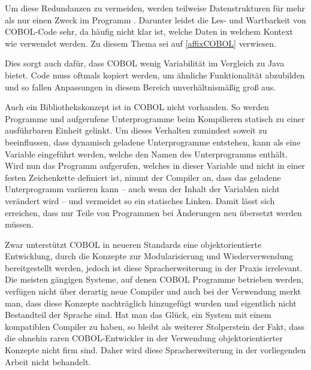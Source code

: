 Um diese Redundanzen zu vermeiden, werden teilweise Datenstrukturen für mehr als nur einen Zweck im Programm . Darunter leidet die Les- und Wartbarkeit von COBOL-Code sehr, da häufig nicht klar ist, welche Daten in welchem Kontext wie verwendet werden. Zu diesem Thema sei auf \autoref{affixCOBOL} verwiesen.

Dies sorgt auch dafür, dass COBOL wenig Variabilität im Vergleich zu Java bietet. Code muss oftmals kopiert werden, um ähnliche Funktionalität abzubilden und so fallen Anpassungen in diesem Bereich unverhältnismäßig groß aus.

Auch ein Bibliothekskonzept ist in COBOL nicht vorhanden. So werden Programme und aufgerufene Unterprogramme beim Kompilieren statisch zu einer ausführbaren Einheit gelinkt. Um dieses Verhalten zumindest soweit zu beeinflussen, dass dynamisch geladene Unterprogramme entstehen, kann als  eine Variable eingeführt werden, welche den Namen des Unterprogramms enthält. Wird nun das Programm aufgerufen, welches in dieser Variable und nicht in einer festen Zeichenkette definiert ist, nimmt der Compiler an, dass das geladene Unterprogramm variieren kann -- auch wenn der Inhalt der Variablen nicht verändert wird -- und vermeidet so ein statisches Linken. Damit lässt sich erreichen, dass nur Teile von Programmen bei Änderungen neu übersetzt werden müssen.

Zwar unterstützt COBOL in neueren Standards eine objektorientierte Entwicklung, durch die Konzepte zur Modularisierung und Wiederverwendung bereitgestellt werden, jedoch ist diese Spracherweiterung in der Praxis irrelevant. Die meisten gängigen Systeme, auf denen COBOL Programme betrieben werden, verfügen nicht über derartig neue Compiler und auch bei der Verwendung merkt man, dass diese Konzepte nachträglich hinzugefügt wurden und eigentlich nicht Bestandteil der Sprache sind. Hat man das Glück, ein System mit einem kompatiblen Compiler zu haben, so bleibt als weiterer Stolperstein der Fakt, dass die ohnehin raren COBOL-Entwickler in der Verwendung objektorientierter Konzepte nicht firm sind. Daher wird diese Spracherweiterung in der vorliegenden Arbeit nicht behandelt. 